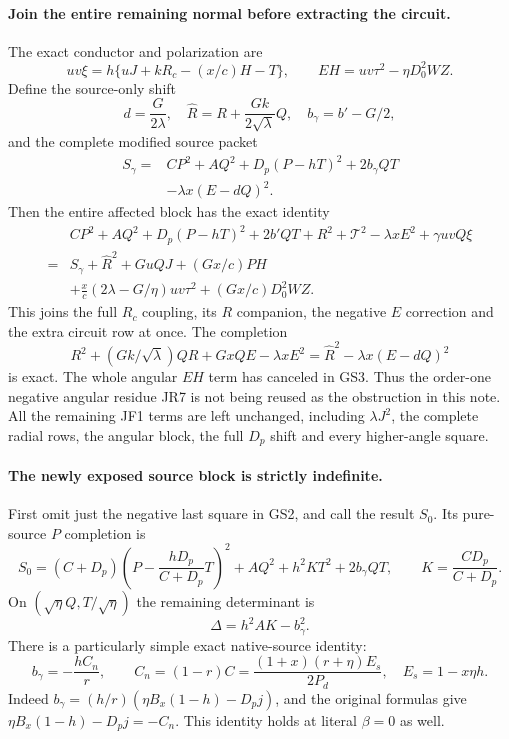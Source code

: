 \paragraph{Join the entire remaining normal before extracting the circuit.}
The exact conductor and polarization are
\[
 uv\xi=h\{uJ+kR_c-(x/c)H-T\},\qquad
 EH=uv\tau^2-\eta D_0^2WZ.                       \tag{GS1}
\]
Define the source-only shift
\[
 d=\frac{G}{2\lambda},\quad
 \widehat R=R+\frac{Gk}{2\sqrt\lambda}Q,
 \quad b_\gamma=b'-G/2,
\]
and the complete modified source packet
\[
 \begin{split}
 S_\gamma={}&CP^2+AQ^2+D_p(P-hT)^2+2b_\gamma QT\\
             &-\lambda x(E-dQ)^2.
 \end{split}                                                   \tag{GS2}
\]
Then the entire affected block has the exact identity
\[
\begin{split}
 &CP^2+AQ^2+D_p(P-hT)^2+2b'QT
       +R^2+\mathcal T^2-\lambda xE^2+\gamma uvQ\xi\\
 ={}&S_\gamma+\widehat R^2+GuQJ+(Gx/c)PH\\
 &+\frac{x}{c}(2\lambda-G/\eta)uv\tau^2
                    +(Gx/c)D_0^2WZ.                 
\end{split}\tag{GS3}
\]
This joins the full $R_c$ coupling, its $R$ companion, the negative
$E$ correction and the extra circuit row at once. The completion
\[
 R^2+(Gk/\sqrt\lambda)QR+GxQE-\lambda xE^2
           =\widehat R^2-\lambda x(E-dQ)^2
\]
is exact. The whole angular $EH$ term has canceled in GS3. Thus the
order-one negative angular residue JR7 is not being reused as the
obstruction in this note. All the remaining JF1 terms are left
unchanged, including $\lambda J^2$, the complete radial rows, the
angular block, the full $D_p$ shift and every higher-angle square.

\paragraph{The newly exposed source block is strictly indefinite.}
First omit just the negative last square in GS2, and call the result
$S_0$. Its pure-source $P$ completion is
\[
 S_0=(C+D_p)\left(P-\frac{hD_p}{C+D_p}T\right)^2
       +AQ^2+h^2K T^2+2b_\gamma QT,
 \qquad K=\frac{CD_p}{C+D_p}.                       \tag{GS4}
\]
On $(\sqrt\eta Q,T/\sqrt\eta)$ the remaining determinant is
\[
                 \Delta=h^2AK-b_\gamma^2.           \tag{GS5}
\]
There is a particularly simple exact native-source identity:
\[
 b_\gamma=-\frac{hC_n}{r},\qquad
 C_n=(1-r)C=\frac{(1+x)(r+\eta)E_s}{2P_d},
 \quad E_s=1-x\eta h.                              \tag{GS6}
\]
Indeed $b_\gamma=(h/r)(\eta B_x(1-h)-D_pj)$, and the original
formulas give $\eta B_x(1-h)-D_pj=-C_n$. This identity holds at
literal $\beta=0$ as well.

